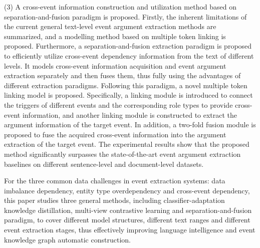 \begin{englishabstract}
(3) A cross-event information construction and utilization method based on separation-and-fusion paradigm is proposed. Firstly, the inherent limitations of the current general text-level event argument extraction methods are summarized, and a modelling method based on multiple token linking is proposed. Furthermore, a separation-and-fusion extraction paradigm is proposed to efficiently utilize cross-event dependency information from the text of different levels. It models cross-event information acquisition and event argument extraction separately and then fuses them, thus fully using the advantages of different extraction paradigms. Following this paradigm, a novel multiple token linking model is proposed. Specifically, a linking module is introduced to connect the triggers of different events and the corresponding role types to provide cross-event information, and another linking module is constructed to extract the argument information of the target event. In addition, a two-fold fusion module is proposed to fuse the acquired cross-event information into the argument extraction of the target event. The experimental results show that the proposed method significantly surpasses the state-of-the-art event argument extraction baselines on different sentence-level and document-level datasets.

For the three common data challenges in event extraction systems: data imbalance dependency, entity type overdependency and cross-event dependency, this paper studies three general methods, including classifier-adaptation knowledge distillation, multi-view contrastive learning and separation-and-fusion paradigm, to cover different model structures, different text ranges and different event extraction stages, thus effectively improving language intelligence and event knowledge graph automatic construction.


\end{englishabstract}
